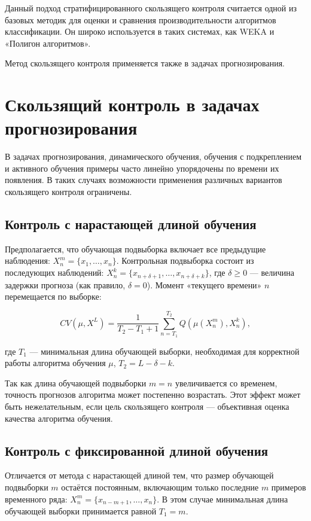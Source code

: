 Данный подход стратифицированного скользящего контроля считается одной из базовых методик для оценки и сравнения производительности алгоритмов классификации. Он широко используется в таких системах, как WEKA и «Полигон алгоритмов».

Метод скользящего контроля применяется также в задачах прогнозирования.


\section{Скользящий контроль в задачах прогнозирования}

В задачах прогнозирования, динамического обучения, обучения с подкреплением и активного обучения примеры часто линейно упорядочены по времени их появления. В таких случаях возможности применения различных вариантов скользящего контроля ограничены.

\subsection{Контроль с нарастающей длиной обучения}  Предполагается, что обучающая подвыборка включает все предыдущие наблюдения: \( X^m_n = \{x_1, \ldots, x_n\} \). Контрольная подвыборка состоит из последующих наблюдений: \( X^k_n = \{x_{n+\delta+1}, \ldots, x_{n+\delta+k}\} \), где \(\delta \geq 0\) — величина задержки прогноза (как правило, \(\delta = 0\)). Момент «текущего времени» \(n\) перемещается по выборке:

\[
    CV(\mu, X^L) = \frac{1}{T_2 - T_1 + 1} \sum_{n=T_1}^{T_2} Q \left(\mu(X^m_n), X^k_n\right),
\]

где \(T_1\) — минимальная длина обучающей выборки, необходимая для корректной работы алгоритма обучения \(\mu\), \(T_2 = L - \delta - k\).

Так как длина обучающей подвыборки \(m = n\) увеличивается со временем, точность прогнозов алгоритма может постепенно возрастать. Этот эффект может быть нежелательным, если цель скользящего контроля — объективная оценка качества алгоритма обучения.

\subsection{Контроль с фиксированной длиной обучения} Отличается от метода с нарастающей длиной тем, что размер обучающей подвыборки \(m\) остаётся постоянным, включающим только последние \(m\) примеров временного ряда: \( X^m_n = \{x_{n-m+1}, \ldots, x_n\} \). В этом случае минимальная длина обучающей выборки принимается равной \(T_1 = m\).


